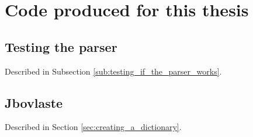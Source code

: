 \chapter{Code produced for this thesis}

\section{Testing the parser}
\label{appendix:testing_the_parser}

Described in Subsection \ref{sub:testing_if_the_parser_works}.



\newpage

\section{Jbovlaste}
\label{appendix:jbovlaste-annex}

Described in Section \ref{sec:creating_a_dictionary}.


